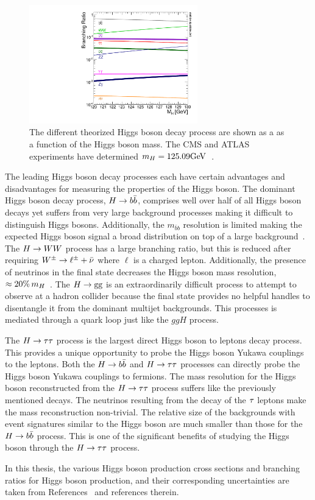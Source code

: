 \begin{figure}[htbp]
\centering
     \includegraphics[width=0.65\textwidth]{phenomenology_of_processes/plots/SMHiggsBR_YR4-square.pdf}
     \caption{
The different theorized Higgs boson decay process are shown as a 
as a function of the Higgs boson mass.
The CMS and ATLAS experiments have determined $m_{H} = 125.09\mathrm{GeV}$~\cite{Aad:2015zhl}.
     }
     \label{fig:higgs_decay}
\end{figure}

The leading Higgs boson decay processes each have certain advantages and disadvantages
for measuring the properties of the Higgs boson. The dominant Higgs boson decay 
process, $H\to b\bar{b}$, comprises well over half of all Higgs boson decays yet suffers
from very large background processes making it difficult to distinguish Higgs bosons.
Additionally, the $m_{\bar{b}b}$ resolution is limited making the expected Higgs boson
signal a broad distribution on top of a large background~\cite{PDG}.
The $H\to WW$ process has a large branching ratio, but this is reduced after requiring
$W^{\pm}\to\ell^{\pm} + \bar{\nu}$ where $\ell$ is a charged lepton. Additionally, the presence of neutrinos
in the final state decreases the Higgs boson mass resolution, $\approx 20\% \, m_{H}$~\cite{PDG}.
The $H\to\text{g}\text{g}$ is an extraordinarily difficult process to attempt to observe at a
hadron collider because the final state provides no helpful handles to disentangle it from
the dominant multijet backgrounds. This processes is mediated through a quark loop just
like the $ggH$ process.

The $H\to\tau\tau$ process is the largest direct Higgs boson to leptons decay process.
This provides a unique opportunity to probe the Higgs boson Yukawa couplings to the leptons.
Both the $H\to b\bar{b}$ and $H\to\tau\tau$ processes can directly probe the Higgs boson
Yukawa couplings to fermions. 
The mass resolution for the Higgs boson reconstructed from the $H\to\tau\tau$ process suffers like
the previously mentioned decays. The neutrinos resulting from the decay of the $\tau$
leptons make the mass reconstruction non-trivial.
The relative size of the backgrounds with event signatures similar to the Higgs boson
are much smaller than those for the $H\to b\bar{b}$ process. This is one
of the significant benefits of studying the Higgs boson through the $H\to\tau\tau$ process.

In this thesis, the various Higgs boson production cross sections and branching ratios
for Higgs boson production, and their corresponding uncertainties are taken from 
References~\cite{deFlorian:2016spz,Denner:2011mq,Ball:2011mu} and references therein.




